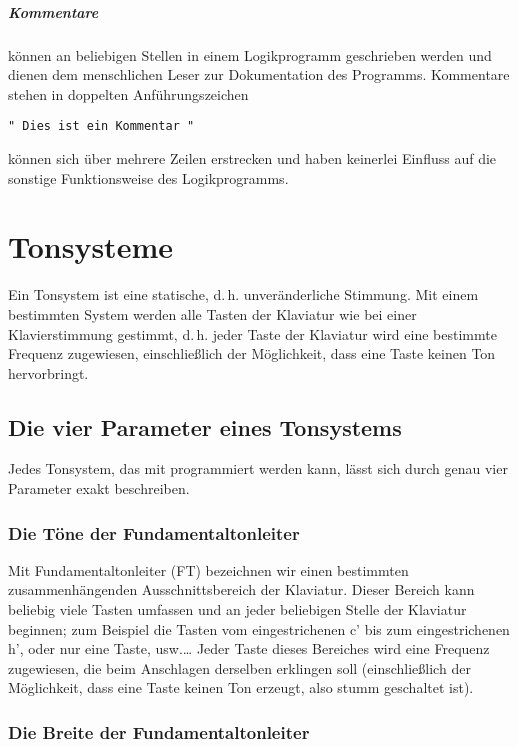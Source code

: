 \paragraph{Kommentare}  können an beliebigen Stellen
in einem Logikprogramm
geschrieben werden und dienen dem menschlichen Leser zur 
Dokumentation des Programms. Kommentare stehen in 
doppelten Anführungszeichen 
\begin{verbatim} 
" Dies ist ein Kommentar " 
\end{verbatim}
können sich über mehrere Zeilen erstrecken und haben keinerlei Einfluss
auf die sonstige Funktionsweise des Logikprogramms.

\chapter{Tonsysteme}\label{cha:tonsysteme}
Ein Tonsystem ist eine statische, d.\,h. unveränderliche Stimmung.
Mit einem bestimmten System werden alle Tasten der Klaviatur wie
bei einer Klavierstimmung gestimmt, d.\,h. jeder Taste der Klaviatur
wird eine bestimmte Frequenz zugewiesen, einschließlich der
Möglichkeit, dass eine Taste keinen Ton hervorbringt.

\section{Die vier Parameter eines Tonsystems}\label{sec:die-vier-parameter}

Jedes Tonsystem, das mit \mutabor{} programmiert
werden kann, lässt sich durch genau vier Parameter exakt
beschreiben.
\subsection{Die Töne der Fundamentaltonleiter}\label{sec:die-tone-der}

Mit Fundamentaltonleiter (FT) bezeichnen wir einen bestimmten
zusammenhängenden Ausschnittsbereich der Klaviatur. Dieser Bereich
kann beliebig viele Tasten umfassen und an jeder beliebigen Stelle
der Klaviatur beginnen; zum Beispiel die Tasten vom
eingestrichenen c' bis zum eingestrichenen h', oder nur eine
Taste, usw.\dots{} Jeder Taste dieses Bereiches wird eine Frequenz
zugewiesen, die beim Anschlagen derselben erklingen soll
(einschließlich der Möglichkeit, dass eine Taste keinen Ton
erzeugt, also stumm geschaltet ist).

\subsection{Die Breite der Fundamentaltonleiter}\label{sec:die-breite-der}


